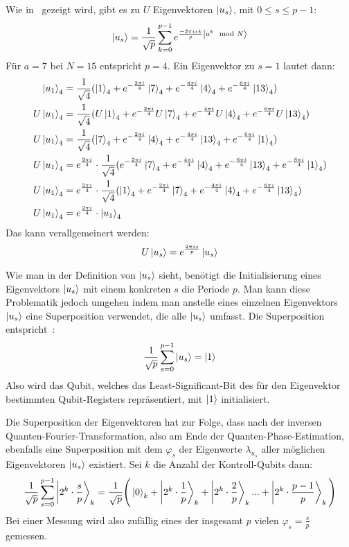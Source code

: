 Wie in~\autocite[227]{nielsen_chuang_2010} gezeigt wird, gibt es zu \(U\) Eigenvektoren \(\ket{u_s}\), 
mit \(0 \leq s \leq p-1\): 
\[\ket{u_s} =
\frac{1}{\sqrt{p}}
\sum_{k=0}^{p-1} e^{\frac{-2 \pi i s k}{p}\ket{a^k \mod N}} %
\]
Für \(a=7\) bei \(N=15\) entspricht \(p=4\).
Ein Eigenvektor zu \(s=1\) lautet dann:
\begin{align*}
    \ket{u_1}_4 &=
    \frac{1}{\sqrt{4}}(
        \ket{1}_4 + 
        e^{-\frac{2 \pi i}{4}}\ket{7}_4 + 
        e^{-\frac{4 \pi i}{4}}\ket{4}_4+ 
        e^{-\frac{6 \pi i}{4}}\ket{13}_4
    )\\   
    U\ket{u_1}_4 &=
    \frac{1}{\sqrt{4}}(
        U\ket{1}_4 + 
        e^{-\frac{2 \pi i}{4}}U\ket{7}_4 + 
        e^{-\frac{4 \pi i}{4}}U\ket{4}_4+ 
        e^{-\frac{6 \pi i}{4}}U\ket{13}_4
    )\\
    U\ket{u_1}_4 &=
    \frac{1}{\sqrt{4}}(
        \ket{7}_4 + 
        e^{-\frac{2 \pi i}{4}}\ket{4}_4 + 
        e^{-\frac{4 \pi i}{4}}\ket{13}_4+ 
        e^{-\frac{6 \pi i}{4}}\ket{1}_4
    )\\
    U\ket{u_1}_4 &=
    e^{\frac{2 \pi i}{4}}
    \cdot
    \frac{1}{\sqrt{4}}(
        e^{-\frac{2 \pi i}{4}}\ket{7}_4 + 
        e^{-\frac{4 \pi i}{4}}\ket{4}_4 + 
        e^{-\frac{6 \pi i}{4}}\ket{13}_4+ 
        e^{-\frac{8 \pi i}{4}}\ket{1}_4
    )\\
    U\ket{u_1}_4 &=
    e^{\frac{2 \pi i}{4}}
    \cdot
    \frac{1}{\sqrt{4}}(
        \ket{1}_4 +
        e^{-\frac{2 \pi i}{4}}\ket{7}_4 + 
        e^{-\frac{4 \pi i}{4}}\ket{4}_4 + 
        e^{-\frac{6 \pi i}{4}}\ket{13}_4 )\\
    U\ket{u_1}_4&=
    e^{\frac{2 \pi i}{4}} \cdot
    \ket{u_1}_4
\end{align*}
Das kann verallgemeinert werden:
\[U\ket{u_s} = e^{\frac{2 \pi i s}{p}}\ket{u_s}\]

Wie man in der Definition von \(\ket{u_s}\) 
sieht, 
benötigt die Initialisierung eines Eigenvektors \(\ket{u_s}\) mit einem konkreten \(s\) die Periode \(p\).
Man kann diese Problematik jedoch umgehen indem man anstelle eines einzelnen Eigenvektors \(\ket{u_s}\)
eine Superposition verwendet, die alle \(\ket{u_s}\) umfasst.
Die Superposition entspricht~\autocite[227]{nielsen_chuang_2010}:
\[\frac{1}{\sqrt{p}} \sum_{s=0}^{p-1}\ket{u_s} = \ket{1}\] 
Also wird das Qubit, welches das Least-Significant-Bit des für den Eigenvektor bestimmten Qubit-Registers repräsentiert, 
mit \(\ket{1}\) initialisiert.

Die Superposition der Eigenvektoren hat zur Folge, 
dass nach der inversen Quanten-Fourier-Transformation, also am Ende der Quanten-Phase-Estimation,
ebenfalls eine Superposition mit dem \(\varphi_s\) der Eigenwerte \(\lambda_{u_s}\) aller möglichen Eigenvektoren \(\ket{u_s}\) existiert.
Sei \(k\) die Anzahl der Kontroll-Qubits dann:
\[
    \frac{1}{\sqrt{p}} \sum_{s=0}^{p-1}\ket{2^k \cdot \frac{s}{p}}_k   = 
    \frac{1}{\sqrt{p}} \Bigg(\ket{0}_k  + \ket{2^k \cdot \frac{1}{p}}_k + \ket{2^k \cdot \frac{2}{p}}_k  ... + \ket{2^k \cdot \frac{p-1}{p}}_k \Bigg)
\]
Bei einer Messung wird also zufällig eines der insgesamt \(p\) vielen \(\varphi_s = \frac{s}{p}\) gemessen.

